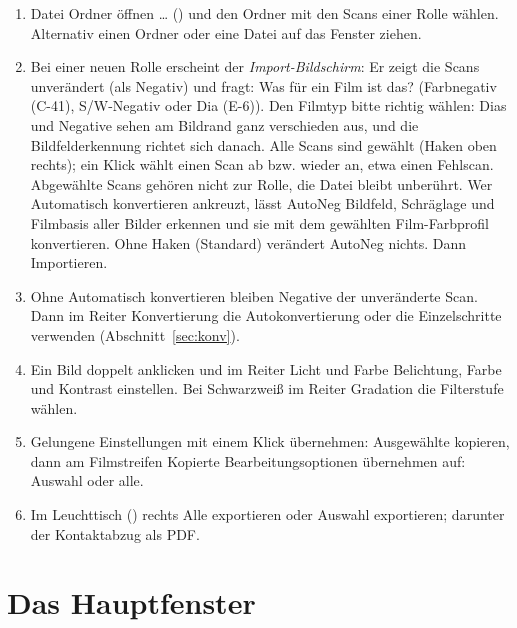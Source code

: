\documentclass[a4paper,11pt,parskip=half,DIV=12]{scrartcl}
\newcommand{\menu}[1]{\textsf{#1}}                    %
\newcommand{\taste}[1]{\fbox{\footnotesize\textsf{#1}}} %
\begin{document}
\begin{enumerate}
  \item \menu{Datei \textrightarrow{} Ordner öffnen …} (\taste{Strg+O}) und den Ordner mit den
        Scans einer Rolle wählen. Alternativ einen Ordner oder eine Datei auf das Fenster ziehen.
  \item Bei einer neuen Rolle erscheint der \emph{Import-Bildschirm}: Er zeigt die Scans
        unverändert (als Negativ) und fragt: \menu{Was für ein Film ist das?}
        (\menu{Farbnegativ (C-41)}, \menu{S/W-Negativ} oder \menu{Dia (E-6)}). Den Filmtyp
        bitte richtig wählen: Dias und Negative sehen am Bildrand ganz verschieden aus, und die
        Bildfelderkennung richtet sich danach. Alle Scans sind gewählt (Haken oben rechts);
        ein Klick wählt einen Scan ab bzw. wieder an, etwa einen Fehlscan. Abgewählte Scans
        gehören nicht zur Rolle, die Datei bleibt unberührt.
        Wer \menu{Automatisch konvertieren} ankreuzt, lässt AutoNeg Bildfeld, Schräglage und
        Filmbasis aller Bilder erkennen und sie mit dem gewählten Film-Farbprofil konvertieren.
        Ohne Haken (Standard) verändert AutoNeg nichts. Dann \menu{Importieren}.
  \item Ohne \menu{Automatisch konvertieren} bleiben Negative der unveränderte Scan. Dann im
        Reiter \menu{Konvertierung} die \menu{Autokonvertierung} oder die Einzelschritte
        verwenden (Abschnitt~\ref{sec:konv}).
  \item Ein Bild doppelt anklicken und im Reiter \menu{Licht und Farbe} Belichtung, Farbe und
        Kontrast einstellen. Bei Schwarzweiß im Reiter \menu{Gradation} die Filterstufe wählen.
  \item Gelungene Einstellungen mit einem Klick übernehmen: \menu{Ausgewählte kopieren}, dann
        am Filmstreifen \menu{Kopierte Bearbeitungsoptionen übernehmen auf: Auswahl} oder
        \menu{alle}.
  \item Im \menu{Leuchttisch} (\taste{G}) rechts \menu{Alle exportieren} oder
        \menu{Auswahl exportieren}; darunter der Kontaktabzug als PDF.
\end{enumerate}

\section{Das Hauptfenster}
\end{document}
